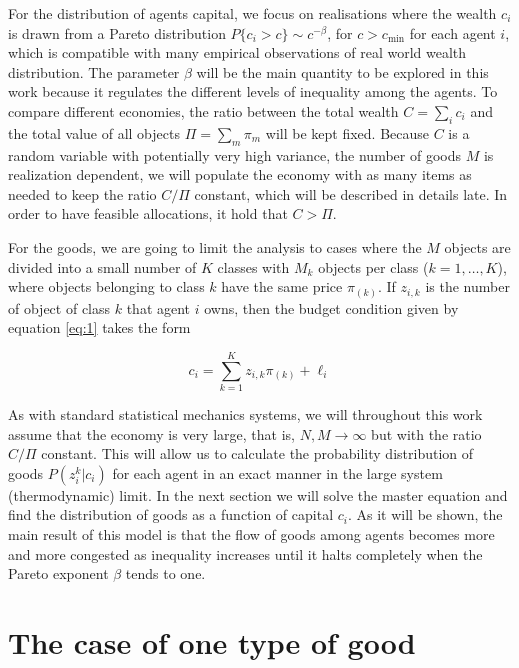 
For the distribution of agents capital, we focus on realisations where the wealth $c_i$ is drawn from a Pareto distribution $P\{c_i> c\} \sim c^{-\beta}$, for $c>c_{\min}$ for each agent $i$, which is compatible with many empirical observations of real world wealth distribution. The parameter $\beta$ will be the main quantity to be explored in this work because it regulates the different levels of inequality among the agents. To compare different economies, the ratio between the total wealth $C=\sum_i c_i$ and the total value of all objects $\Pi=\sum_{m}\pi_m$ will be kept fixed. Because $C$ is a random variable with potentially very high variance, the number of goods $M$ is realization dependent, we will populate the economy with as many items as needed to keep the ratio $C/\Pi$ constant, which will be described in details late. In order to have feasible allocations, it hold that $C>\Pi$.

For the goods, we are going to limit the analysis to cases where the $M$ objects are divided into a small number of $K$ classes with $M_k$ objects per class ($k=1,\ldots,K$), where objects belonging to class $k$ have the same price $\pi_{(k)}$. If $z_{i,k}$ is the number of object of class $k$ that agent $i$ owns, then the budget condition given by equation \eqref{eq:1} takes the form

\begin{equation}
c_i =  \sum_{k=1}^K z_{i , k} \pi_{(k)} + \ell_i
\end{equation}

As with standard statistical mechanics systems, we will throughout this work assume that the economy is very large, that is, $N, M \to \infty$ but with the ratio $C/\Pi$ constant. This will allow us to calculate the probability distribution of goods $P (z_i^k | c_i)$ for each agent in an exact manner in the large system (thermodynamic) limit. In the next section we will solve the master equation and find the distribution of goods as a function of capital $c_i$. As it will be shown, the main result of this model is that the flow of goods among agents becomes more and more congested as inequality increases until it halts completely when the Pareto exponent $\beta$ tends to one.


\section{The case of one type of good}

